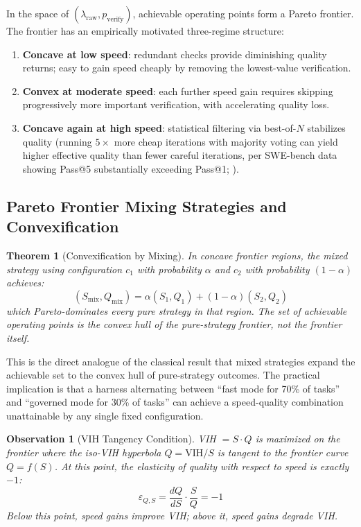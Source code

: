 \documentclass[11pt, a4paper]{googledeepmind}
\newtheorem{theorem}{Theorem}[section]
\newtheorem{observation}{Observation}[section]
\begin{document}
In the space of $(\lambda_{\text{raw}}, p_{\text{verify}})$, achievable operating points form a Pareto frontier. The frontier has an empirically motivated three-regime structure:

\begin{enumerate}[nosep]
    \item \textbf{Concave at low speed}: redundant checks provide diminishing quality returns; easy to gain speed cheaply by removing the lowest-value verification.
    \item \textbf{Convex at moderate speed}: each further speed gain requires skipping progressively more important verification, with accelerating quality loss.
    \item \textbf{Concave again at high speed}: statistical filtering via best-of-$N$ stabilizes quality (running $5\times$ more cheap iterations with majority voting can yield higher effective quality than fewer careful iterations, per SWE-bench data showing Pass@5 substantially exceeding Pass@1; \citealt{sweeffi2025}).
\end{enumerate}

\subsection{Pareto Frontier Mixing Strategies and Convexification}

\begin{theorem}[Convexification by Mixing]
\label{thm:convexification}
In concave frontier regions, the mixed strategy using configuration $c_1$ with probability $\alpha$ and $c_2$ with probability $(1-\alpha)$ achieves:
\begin{equation}
    (S_{\mathrm{mix}}, Q_{\mathrm{mix}}) = \alpha(S_1, Q_1) + (1-\alpha)(S_2, Q_2)
\end{equation}
which Pareto-dominates every pure strategy in that region. The set of achievable operating points is the \emph{convex hull} of the pure-strategy frontier, not the frontier itself.
\end{theorem}

This is the direct analogue of the classical result that mixed strategies expand the achievable set to the convex hull of pure-strategy outcomes. The practical implication is that a harness alternating between ``fast mode for 70\% of tasks'' and ``governed mode for 30\% of tasks'' can achieve a speed-quality combination unattainable by any single fixed configuration.

\begin{observation}[VIH Tangency Condition]
\label{thm:vih-tangency}
VIH $= S \cdot Q$ is maximized on the frontier where the iso-VIH hyperbola $Q = \text{VIH}/S$ is tangent to the frontier curve $Q = f(S)$. At this point, the elasticity of quality with respect to speed is exactly $-1$:
\begin{equation}
    \varepsilon_{Q,S} = \frac{dQ}{dS} \cdot \frac{S}{Q} = -1
\end{equation}
Below this point, speed gains improve VIH; above it, speed gains degrade VIH.
\end{observation}
\end{document}
